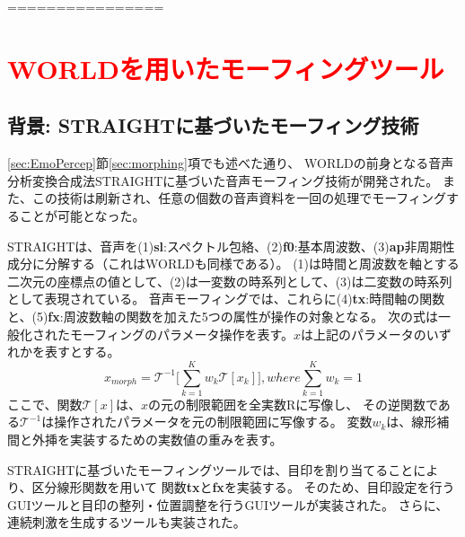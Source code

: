 ================

\section{\textcolor{red}{WORLDを用いたモーフィングツール}\cite{kawahara2024interactive,kawahara2022WORLDGUI_J,kawahara2014morph}}
\label{sec:morphTools}
\subsection{背景: STRAIGHTに基づいたモーフィング技術}
\ref{sec:EmoPercep}節\ref{sec:morphing}項でも述べた通り、
WORLDの前身となる音声分析変換合成法STRAIGHT\cite{kawahara1999restructuring}に基づいた音声モーフィング技術が開発された\cite{matsui2003STRAIGHT}。
また、この技術は刷新され、任意の個数の音声資料を一回の処理でモーフィングすることが可能となった\cite{kawahara2013morph,kawahara2014morph}。

STRAIGHTは、音声を(1)\textbf{sl}:スペクトル包絡、(2)\textbf{f0}:基本周波数、(3)\textbf{ap}非周期性成分に分解する（これはWORLDも同様である）。
(1)は時間と周波数を軸とする二次元の座標点の値として、(2)は一変数の時系列として、(3)は二変数の時系列として表現されている。 
音声モーフィングでは、これらに(4)\textbf{tx}:時間軸の関数と、(5)\textbf{fx}:周波数軸の関数を加えた5つの属性が操作の対象となる。
次の式は一般化されたモーフィングのパラメータ操作を表す。$x$は上記のパラメータのいずれかを表すとする。
\begin{equation}
    x_{morph} = \mathcal{T}^{-1}\Bigg[\sum^{K}_{k=1}w_k \mathcal{T}[x_k]\Bigg] , where \sum^{K}_{k=1}w_k = 1
\end{equation}
ここで、関数$\mathcal{T}[x]$は、$x$の元の制限範囲を全実数Rに写像し、
その逆関数である$\mathcal{T}^{-1}$は操作されたパラメータを元の制限範囲に写像する。
変数$w_k$は、線形補間と外挿を実装するための実数値の重みを表す。

STRAIGHTに基づいたモーフィングツールでは、目印を割り当てることにより、区分線形関数を用いて
関数\textbf{tx}と\textbf{fx}を実装する\cite{kawahara2013morph}。
そのため、目印設定を行うGUIツールと目印の整列・位置調整を行うGUIツールが実装された。
さらに、連続刺激を生成するツールも実装された。


